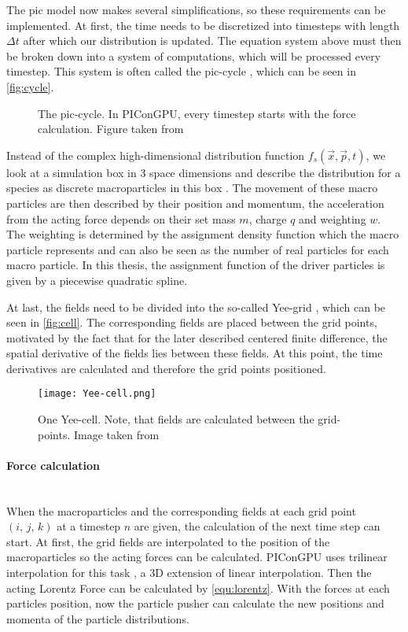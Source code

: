 \documentclass[bachelor_thesis]{subfiles}
\begin{document}
The \gls{pic} model now makes several simplifications, so these requirements can be implemented.
At first, the time needs to be discretized into timesteps with length $\Delta t$ after which our distribution is updated. The equation system above must then be broken down into a system of computations, which will be processed every timestep.
This system is often called the \gls{pic}-cycle \cite{Huebl2019}, which can be seen in \autoref{fig:cycle}.

\begin{figure}
	\centering
	\missingfigure{}
	\caption{The \gls{pic}-cycle. In PIConGPU, every timestep starts with the force calculation. Figure taken from \cite{Pausch2019}}
	\label{fig:cycle}
\end{figure}

Instead of the complex high-dimensional distribution function $f_s(\vec{x}, \vec{p}, t)$, we look at a simulation box in 3 space dimensions and describe the distribution for a species as discrete macroparticles in this box \cite{Burau2010}.
The movement of these macro particles are then described by their position and momentum, the acceleration from the acting force depends on their set mass $m$, charge $q$ and weighting $w$.
The weighting is determined by the assignment density function which the macro particle represents and can also be seen as the number of real particles for each macro particle.
In this thesis, the assignment function of the driver particles is given by a piecewise quadratic spline.

At last, the fields need to be divided into the so-called Yee-grid \cite{Yee1966}, which can be seen in \autoref{fig:cell}. The corresponding fields are placed between the grid points, motivated by the fact that for the later described centered finite difference, 
the spatial derivative of the fields lies between these fields. At this point, the time derivatives are calculated and therefore the grid points positioned.

\begin{figure}
	\centering
	\texttt{[image: Yee-cell.png]}
	\caption{One Yee-cell. Note, that fields are calculated between the grid-points. Image taken from \cite{PICRepo}}
	\label{fig:cell}
\end{figure}

\paragraph*{Force calculation}\hspace{0pt} \\
When the macroparticles and the corresponding fields at each grid point $(i, \, j, \,k)$ at a timestep $n$ are given, the calculation of the next time step can start.
At first, the grid fields are interpolated to the position of the macroparticles so the acting forces can be calculated. PIConGPU uses trilinear interpolation for this task \cite{Huebl2019, PICRepo}, a 3D extension of linear interpolation.
Then the acting Lorentz Force can be calculated by \autoref{equ:lorentz}. With the forces at each particles position, now the particle pusher can calculate the new positions and momenta of the particle distributions.
\end{document}
